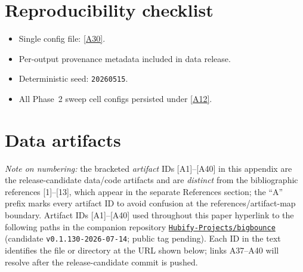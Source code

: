 \documentclass[aps,prd,twocolumn,superscriptaddress,showpacs,preprintnumbers,nofootinbib,longbibliography,floatfix]{revtex4-2}
\newcommand{\repoBase}{https://github.com/Hubify-Projects/bigbounce/blob/main}
\newcommand{\paperVersion}{v0.1.130-2026-07-14}
\begin{document}
\section*{Reproducibility checklist}
\begin{itemize}
\item Single config file:
\href{\repoBase/pipelines/p5\_desi\_chirality/env\_finder/config.yaml}{[A30]}.
\item Per-output provenance metadata included in data release.
\item Deterministic seed: \texttt{20260515}.
\item All Phase~2 sweep cell configs persisted under
\href{\repoBase/pipelines/p5\_desi\_chirality/data/desi\_env/phase2\_sweep}{[A12]}.
\end{itemize}

\section{Data artifacts}\label{app:artifacts}

\emph{Note on numbering:} the bracketed \emph{artifact} IDs
[A1]--[A40] in this appendix are the release-candidate data/code
artifacts and are \emph{distinct} from the bibliographic references
[1]--[13], which appear in the separate References section; the ``A''
prefix marks every artifact ID to avoid confusion at the
references/artifact-map boundary. Artifact IDs [A1]--[A40] used
throughout this paper hyperlink to the following paths in the companion
repository
\href{https://github.com/Hubify-Projects/bigbounce}{\texttt{Hubify-Projects/bigbounce}}
(candidate \texttt{\paperVersion}; public tag pending). Each ID in the
text identifies the file or directory at the URL shown below; links A37--A40
will resolve after the release-candidate commit is pushed.
\end{document}
